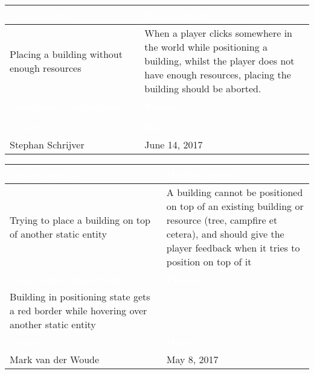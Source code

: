 \begin{tabularx}{\textwidth}{|X|X|}
\hline
\rowcolor{lightgray}\textcolor{white}{\textbf{Test scenario}} &
\textcolor{white}{\textbf{Desired result}}       
\\\hline
Placing a building without enough resources &
When a player clicks somewhere in the world while positioning a building, whilst the player does not have enough resources, placing the building should be aborted.       
\\\hline
\rowcolor{lightgray}\textcolor{white}{\textbf{Comments/suggestions}} & 
\textcolor{white}{\textbf{Passed}}
\\\hline
 & \cellcolor{green}                       
\\\hline
\rowcolor{lightgray}\textcolor{white}{\textbf{Tester}} & 
\textcolor{white}{\textbf{Date}}               
\\\hline
Stephan Schrijver & June 14, 2017                               		 
\\\hline
\end{tabularx}


\begin{tabularx}{\textwidth}{|X|X|}
\hline
\rowcolor{lightgray}\textcolor{white}{\textbf{Test scenario}} &
\textcolor{white}{\textbf{Desired result}}       
\\\hline
Trying to place a building on top of another static entity &
A building cannot be positioned on top of an existing building or resource (tree, campfire et cetera), and should give the player feedback when it tries to position on top of it
\\\hline
\rowcolor{lightgray}\textcolor{white}{\textbf{Comments/suggestions}} & 
\textcolor{white}{\textbf{Passed}}
\\\hline
Building in positioning state gets a red border while hovering over another static entity & \cellcolor{green}                       
\\\hline
\rowcolor{lightgray}\textcolor{white}{\textbf{Tester}} & 
\textcolor{white}{\textbf{Date}}               
\\\hline
Mark van der Woude & May 8, 2017                               		 
\\\hline
\end{tabularx}